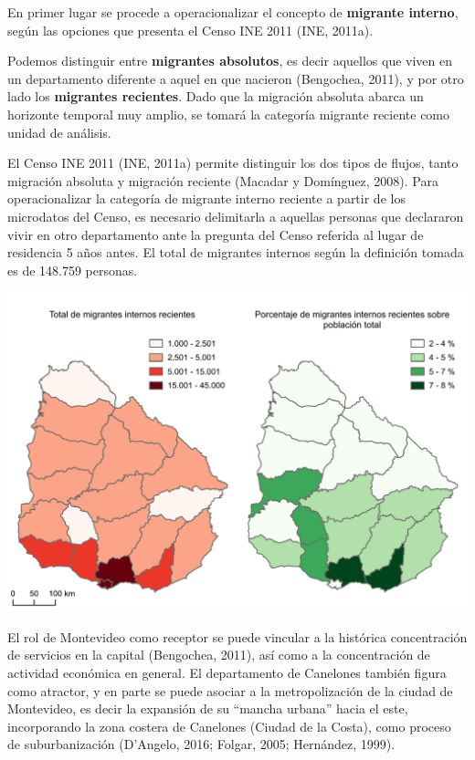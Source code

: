 \documentclass[12pt,spanish,]{article}
\let\origfigure\figure
\let\endorigfigure\endfigure
\renewenvironment{figure}[1][2] {
    \expandafter\origfigure\expandafter[H]
} {
    \endorigfigure
}
\begin{document}
En primer lugar se procede a operacionalizar el concepto de
\textbf{migrante interno}, según las opciones que presenta el Censo INE
2011 (INE, 2011a).

Podemos distinguir entre \textbf{migrantes absolutos}, es decir aquellos
que viven en un departamento diferente a aquel en que nacieron
(Bengochea, 2011), y por otro lado los \textbf{migrantes recientes}.
Dado que la migración absoluta abarca un horizonte temporal muy amplio,
se tomará la categoría migrante reciente como unidad de análisis.

El Censo INE 2011 (INE, 2011a) permite distinguir los dos tipos de
flujos, tanto migración absoluta y migración reciente (Macadar y
Domínguez, 2008). Para operacionalizar la categoría de migrante interno
reciente a partir de los microdatos del Censo, es necesario delimitarla
a aquellas personas que declararon vivir en otro departamento ante la
pregunta del Censo referida al lugar de residencia 5 años antes. El
total de migrantes internos según la definición tomada es de 148.759
personas.

\begin{figure}
\hypertarget{fig:mapa_gemelo}{%
\centering
\includegraphics{./tex2pdf.-8c1f0593c1a83dbe/0fa4e601e9e3005ce60a7e916adf7e03dbd16ccd.pdf}
\caption{Migrantes internos recientes según el Censo
2011.}\label{fig:mapa_gemelo}
}
\end{figure}

El rol de Montevideo como receptor se puede vincular a la histórica
concentración de servicios en la capital (Bengochea, 2011), así como a
la concentración de actividad económica en general. El departamento de
Canelones también figura como atractor, y en parte se puede asociar a la
metropolización de la ciudad de Montevideo, es decir la expansión de su
``mancha urbana'' hacia el este, incorporando la zona costera de
Canelones (Ciudad de la Costa), como proceso de suburbanización
(D'Angelo, 2016; Folgar, 2005; Hernández, 1999).
\end{document}
